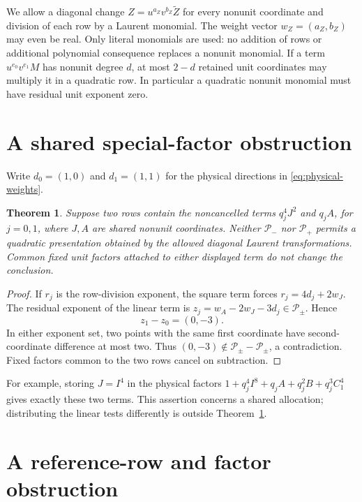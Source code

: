 \documentclass[11pt,a4paper]{article}
\newtheorem{theorem}{Theorem}[section]
\begin{document}
We allow a diagonal change $Z=u^{a_Z}v^{b_Z}\widetilde Z$ for every
nonunit coordinate and division of each row by a Laurent monomial.
The weight vector $w_Z=(a_Z,b_Z)$ may even be real. Only literal
monomials are used: no addition of rows or additional polynomial
consequence replaces a nonunit monomial. If a term $u^{e_0}v^{e_1}M$
has nonunit degree $d$, at most $2-d$ retained unit coordinates may
multiply it in a quadratic row. In particular a quadratic nonunit
monomial must have residual unit exponent zero.

\section{A shared special-factor obstruction}

Write $d_0=(1,0)$ and $d_1=(1,1)$ for the physical directions in
\eqref{eq:physical-weights}.

\begin{theorem}\label{thm:special}
Suppose two rows contain the noncancelled terms $q_j^4J^2$ and
$q_j A$, for $j=0,1$, where $J,A$ are shared nonunit coordinates.
Neither $\mathcal P_-$ nor $\mathcal P_+$ permits a quadratic
presentation obtained by the allowed diagonal Laurent transformations.
Common fixed unit factors attached to either displayed term do not
change the conclusion.
\end{theorem}
\begin{proof}
If $r_j$ is the row-division exponent, the square term forces
$r_j=4d_j+2w_J$. The residual exponent of the linear term is
$z_j=w_A-2w_J-3d_j\in\mathcal P_\pm$. Hence
\[
                         z_1-z_0=(0,-3).
\]
In either exponent set, two points with the same first coordinate
have second-coordinate difference at most two. Thus
$(0,-3)\notin\mathcal P_\pm-\mathcal P_\pm$, a contradiction.
Fixed factors common to the two rows cancel on subtraction.
\end{proof}

For example, storing $J=I^4$ in the physical factors
$1+q_j^4 I^8+q_j A+q_j^2B+q_j^3C_1^4$ gives exactly these two
terms. This assertion concerns a shared allocation; distributing
the linear tests differently is outside Theorem~\ref{thm:special}.

\section{A reference-row and factor obstruction}
\end{document}
